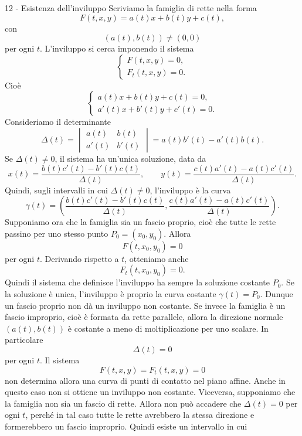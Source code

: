 \documentclass[a4paper]{article}
\begin{document}
\begin{snippetsolution}{12 - Esistenza dell'inviluppo}
    Scriviamo la famiglia di rette nella forma
    \[
        F(t,x,y)=a(t)x+b(t)y+c(t),
    \]
    con
    \[
        (a(t),b(t))\neq(0,0)
    \]
    per ogni \(t\). L'inviluppo si cerca imponendo il sistema
    \[
        \begin{cases}
            F(t,x,y)=0,\\
            F_t(t,x,y)=0.
        \end{cases}
    \]
    Cioè
    \[
        \begin{cases}
            a(t)x+b(t)y+c(t)=0,\\
            a'(t)x+b'(t)y+c'(t)=0.
        \end{cases}
    \]
    Consideriamo il determinante
    \[
        \Delta(t)=
        \begin{vmatrix}
            a(t) & b(t)\\
            a'(t) & b'(t)
        \end{vmatrix}
        =
        a(t)b'(t)-a'(t)b(t).
    \]
    Se \(\Delta(t)\neq0\), il sistema ha un'unica soluzione, data da
    \[
        x(t)=\frac{b(t)c'(t)-b'(t)c(t)}{\Delta(t)},
        \qquad
        y(t)=\frac{c(t)a'(t)-a(t)c'(t)}{\Delta(t)}.
    \]
    Quindi, sugli intervalli in cui \(\Delta(t)\neq0\), l'inviluppo è la curva
    \[
        \gamma(t)=
        \left(
            \frac{b(t)c'(t)-b'(t)c(t)}{\Delta(t)},
            \frac{c(t)a'(t)-a(t)c'(t)}{\Delta(t)}
        \right).
    \]
    Supponiamo ora che la famiglia sia un fascio proprio, cioè che tutte le rette passino per uno stesso punto \(P_0=(x_0,y_0)\). Allora
    \[
        F(t,x_0,y_0)=0
    \]
    per ogni \(t\). Derivando rispetto a \(t\), otteniamo anche
    \[
        F_t(t,x_0,y_0)=0.
    \]
    Quindi il sistema che definisce l'inviluppo ha sempre la soluzione costante \(P_0\). Se la soluzione è unica, l'inviluppo è proprio la curva costante \(\gamma(t)=P_0\). Dunque un fascio proprio non dà un inviluppo non costante.
    Se invece la famiglia è un fascio improprio, cioè è formata da rette parallele, allora la direzione normale \((a(t),b(t))\) è costante a meno di moltiplicazione per uno scalare. In particolare
    \[
        \Delta(t)=0
    \]
    per ogni \(t\). Il sistema
    \[
        F(t,x,y)=F_t(t,x,y)=0
    \]
    non determina allora una curva di punti di contatto nel piano affine. Anche in questo caso non si ottiene un inviluppo non costante.
    Viceversa, supponiamo che la famiglia non sia un fascio di rette. Allora non può accadere che \(\Delta(t)=0\) per ogni \(t\), perché in tal caso tutte le rette avrebbero la stessa direzione e formerebbero un fascio improprio. Quindi esiste un intervallo in cui

\end{snippetsolution}
\end{document}
